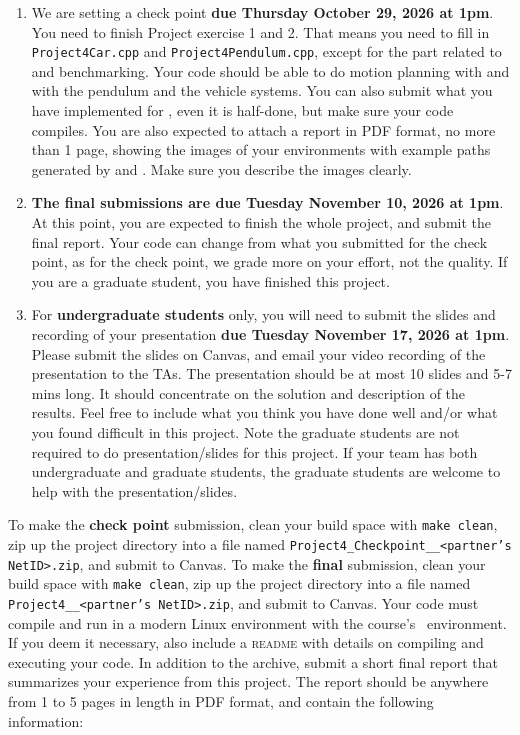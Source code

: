 \documentclass{comp450}
\begin{document}
\begin{enumerate}
	\item We are setting a check point \textbf{due Thursday October 29, 2026 at 1pm}. You need to finish Project exercise 1 and 2. That means you need to fill in \texttt{Project4Car.cpp} and \texttt{Project4Pendulum.cpp}, except for the part related to  and benchmarking. Your code should be able to do motion planning with  and  with the pendulum and the vehicle systems. You can also submit what you have implemented for , even it is half-done, but make sure your code compiles. You are also expected to attach a report in \textsc{PDF} format, no more than 1 page, showing the images of your environments with example paths generated by  and . Make sure you describe the images clearly.

	\item \textbf{The final submissions are due Tuesday November 10, 2026 at 1pm}. At this point, you are expected to finish the whole project, and submit the final report. Your code can change from what you submitted for the check point, as for the check point, we grade more on your effort, not the quality. If you are a graduate student, you have finished this project.

	\item For \textbf{undergraduate students} only, you will need to submit the slides and recording of your presentation \textbf{due Tuesday November 17, 2026 at 1pm}. Please submit the slides on Canvas, and email your video recording of the presentation to the TAs.
	      The presentation should be at most 10 slides and 5-7 mins long.
	      It should concentrate on the solution and description of the results. Feel free to include what you think you have done well and/or what you found difficult in this project.
	      Note the graduate students are not required to do presentation/slides for this project. If your team has both undergraduate and graduate students, the graduate students are welcome to help with the presentation/slides.

\end{enumerate}

To make the \textbf{check point} submission, clean your build space with \texttt{make clean}, zip up the project directory into a file named \texttt{Project4\_Checkpoint\_<your NetID>\_<partner's NetID>.zip}, and submit to Canvas.
To make the \textbf{final} submission, clean your build space with \texttt{make clean}, zip up the project directory into a file named \texttt{Project4\_<your NetID>\_<partner's NetID>.zip}, and submit to Canvas.
Your code must compile and run in a modern Linux environment with the course's \ompl\ environment.
If you deem it necessary, also include a \textsc{readme} with details on compiling and executing your code.
In addition to the archive, submit a short final report that summarizes your experience from this project.
The report should be anywhere from 1 to 5 pages in length in \textsc{PDF} format, and contain the following information:
\end{document}
